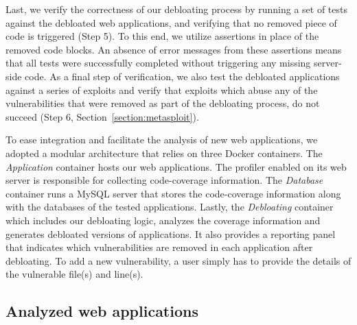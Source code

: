 Last, we verify the correctness of our debloating process by running
a set of tests against the debloated web applications, and verifying that
no removed piece of code is triggered (Step 5). To this end, we
utilize assertions in place of the removed code blocks. An absence of error
messages from these assertions means that all tests were successfully
completed without triggering any missing server-side code. As a final step of
verification, we also test the debloated applications against a series of
exploits and verify that exploits which
abuse any of the vulnerabilities that were removed as part of the debloating
process, do not succeed (Step 6, Section~\ref{section:metasploit}).

To ease integration and facilitate the analysis of new web applications, we
adopted a modular architecture that relies on three Docker containers. The
\textit{Application} container hosts our web applications.  The profiler
enabled on its web server is responsible for collecting code-coverage
information. The \textit{Database} container runs a MySQL server that
stores the code-coverage information along with the databases of the tested
applications. Lastly, the \textit{Debloating} container which includes our
debloating logic, analyzes the coverage information and generates debloated
versions of applications. It also provides a reporting panel that indicates
which vulnerabilities are removed in each application after debloating. To add
a new vulnerability, a user simply has to provide the details of the vulnerable
file(s) and line(s).



\subsection{Analyzed web applications}
\label{subsec:webapps}

